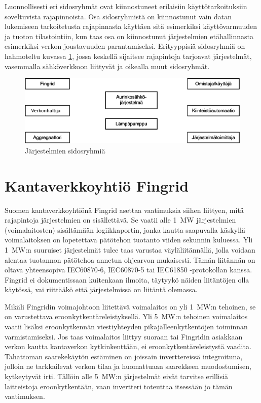 Luonnollisesti eri sidosryhmät ovat kiinnostuneet erilaisiin käyttötarkoituksiin soveltuvista rajapinnoista. Osa sidosryhmistä on kiinnostunut vain datan lukemiseen tarkoitetusta rajapinnasta käyttäen sitä esimerkiksi käyttövarmuuden ja tuoton tilastointiin, kun taas osa on kiinnostunut järjestelmien etähallinnasta esimerkiksi verkon joustavuuden parantamiseksi. Erityyppisiä sidosryhmiä on hahmoteltu kuvassa \ref{fig:sidosryhmat}, jossa keskellä sijaitsee rajapintoja tarjoavat järjestelmät, vasemmalla sähköverkkoon liittyvät ja oikealla muut sidosryhmät.

\begin{figure}[h]
  \centering
  \includegraphics[width=1\textwidth]{figures/sidosryhmat}
  \caption{Järjestelmien sidosryhmiä}
  \label{fig:sidosryhmat}
\end{figure}

\section{Kantaverkkoyhtiö Fingrid}
  Suomen kantaverkkoyhtiönä Fingrid asettaa vaatimuksia siihen liittyen, mitä rajapintoja järjestelmien on sisällettävä. Se vaatii alle \SI{1}{\mega\watt} järjestelmien (voimalaitosten) sisältämään logiikkaportin, jonka kautta saapuvalla käskyllä voimalaitoksen on lopetettava pätötehon tuotanto viiden sekunnin kuluessa. Yli \SI{1}{\mega\watt}:n suuruiset järjestelmät tulee taas varustaa väyläliitännällä, jolla voidaan alentaa tuotannon pätötehoa annetun ohjearvon mukaisesti. Tämän liitännän on oltava yhteensopiva IEC60870-6, IEC60870-5 tai IEC61850 -protokollan kanssa. Fingrid ei dokumentissaan kuitenkaan ilmoita, täytyykö näiden liitäntöjen olla käytössä, vai riittääkö että järjestelmissä on liitäntä olemassa. \parencite{VJV2018}

  Mikäli Fingridin voimajohtoon liitettävä voimalaitos on yli \SI{1}{\mega\watt}:n tehoinen, se on varustettava eroonkytkentäreleistyksellä. Yli \SI{5}{\mega\watt}:n tehoinen voimalaitos vaatii lisäksi eroonkytkennän viestiyhteyden pikajälleenkytkentöjen toiminnan varmistamiseksi. Jos taas voimalaitos liittyy suoraan tai Fingridin asiakkaan verkon kautta kantaverkon kytkinkenttään, ei eroonkytkentäreleistystä vaadita. Tahattoman saarekekäytön estäminen on joissain inverttereissä integroituna, jolloin ne tarkkailevat verkon tilaa ja huomattuaan saarekkeen muodostumisen, kytkeytyvät irti. Tällöin alle \SI{5}{\mega\watt}:n järjestelmät eivät tarvitse erillisiä laitteistoja eroonkytkentään, vaan invertteri toteuttaa itsessään jo tämän vaatimuksen. \parencite{VJV2018}

